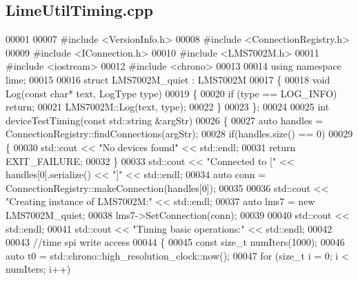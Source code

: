 \subsection{Lime\+Util\+Timing.\+cpp}
\label{LimeUtilTiming_8cpp_source}

\begin{DoxyCode}
00001 
00007 \textcolor{preprocessor}{#include <VersionInfo.h>}
00008 \textcolor{preprocessor}{#include <ConnectionRegistry.h>}
00009 \textcolor{preprocessor}{#include <IConnection.h>}
00010 \textcolor{preprocessor}{#include <LMS7002M.h>}
00011 \textcolor{preprocessor}{#include <iostream>}
00012 \textcolor{preprocessor}{#include <chrono>}
00013 
00014 \textcolor{keyword}{using namespace }lime;
00015 
00016 \textcolor{keyword}{struct }LMS7002M_quiet : LMS7002M
00017 \{
00018     \textcolor{keywordtype}{void} Log(\textcolor{keyword}{const} \textcolor{keywordtype}{char}* text, LogType type)
00019     \{
00020         \textcolor{keywordflow}{if} (type == LOG\_INFO) \textcolor{keywordflow}{return};
00021         LMS7002M::Log(text, type);
00022     \}
00023 \};
00024 
00025 \textcolor{keywordtype}{int} deviceTestTiming(\textcolor{keyword}{const} std::string &argStr)
00026 \{
00027     \textcolor{keyword}{auto} handles = ConnectionRegistry::findConnections(argStr);
00028     \textcolor{keywordflow}{if}(handles.size() == 0)
00029     \{
00030         std::cout << \textcolor{stringliteral}{"No devices found"} << std::endl;
00031         \textcolor{keywordflow}{return} EXIT\_FAILURE;
00032     \}
00033     std::cout << \textcolor{stringliteral}{"Connected to ["} << handles[0].serialize() << \textcolor{stringliteral}{"]"} << std::endl;
00034     \textcolor{keyword}{auto} conn = ConnectionRegistry::makeConnection(handles[0]);
00035 
00036     std::cout << \textcolor{stringliteral}{"Creating instance of LMS7002M:"} << std::endl;
00037     \textcolor{keyword}{auto} lms7 = \textcolor{keyword}{new} LMS7002M_quiet;
00038     lms7->SetConnection(conn);
00039 
00040     std::cout << std::endl;
00041     std::cout << \textcolor{stringliteral}{"Timing basic operations:"} << std::endl;
00042 
00043     \textcolor{comment}{//time spi write access}
00044     \{
00045         \textcolor{keyword}{const} \textcolor{keywordtype}{size\_t} numIters(1000);
00046         \textcolor{keyword}{auto} t0 = std::chrono::high\_resolution\_clock::now();
00047         \textcolor{keywordflow}{for} (\textcolor{keywordtype}{size\_t} i = 0; i < numIters; i++)

\end{DoxyCode}
